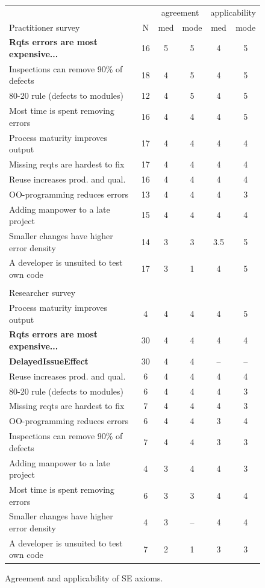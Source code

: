 \documentclass[smallcondensed]{svjour3}
\begin{document}
\begin{figure}[!ht] 
\scriptsize 
 \begin{center}
\begin{tabular}{l|c|c|c|c|c}
 &  & \multicolumn{2}{c|}{agreement} & \multicolumn{2}{c}{applicability} \\
Practitioner survey  & N & med & mode & med & mode \\
\hline 
\textbf{Rqts errors are most expensive...} & 16 & 5 & 5 & 4 & 5 \\ 
Inspections can remove 90\% of defects & 18 & 4 & 5 & 4 & 5 \\
80-20 rule (defects to modules) & 12 & 4 & 5 & 4 & 5 \\
Most time is spent removing errors & 16 & 4 & 4 & 4 & 5 \\ 
Process maturity improves output & 17 & 4 & 4 & 4 & 4 \\ 
Missing reqts are hardest to fix & 17 & 4 & 4 & 4 & 4 \\
Reuse increases prod. and qual. & 16 & 4 & 4 & 4 & 4 \\
OO-programming reduces errors & 13 & 4 & 4 & 4 & 3 \\
Adding manpower to a late project & 15 & 4 & 4 & 4 & 4 \\
Smaller changes have higher error density & 14 & 3 & 3 & 3.5 & 5 \\
A developer is unsuited to test own code & 17 & 3 & 1 & 4 & 5\\
 \multicolumn{6}{l}{}\\
\multicolumn{6}{l}{Researcher survey} \\\hline 
Process maturity improves output & 4 & 4 & 4 & 4 & 5 \\
\textbf{Rqts errors are most expensive...} & 30 & 4 & 4 & 4 & 4   \\ 
\textbf{DelayedIssueEffect} & 30 & 4 & 4 & -- & --  \\
Reuse increases prod. and qual. & 6 & 4 & 4 & 4 & 4 \\
80-20 rule (defects to modules) & 6 & 4 & 4 & 4 & 3 \\
Missing reqts are hardest to fix & 7 & 4 & 4 & 4 & 3 \\
OO-programming reduces errors & 6 & 4 & 4 & 3 & 4 \\
Inspections can remove 90\% of defects & 7 & 4 & 4 & 3 & 3 \\
Adding manpower to a late project & 4 & 3 & 4 & 4 & 3 \\
Most time is spent removing errors & 6 & 3 & 3 & 4 & 4 \\ 
Smaller changes have higher error density & 4 & 3 & -- & 4 & 4 \\
A developer is unsuited to test own code & 7 & 2 & 1 & 3 & 3
\end{tabular} 
 \end{center}
\caption{Agreement and applicability of SE axioms.}
\label{fig:survey_results}
\end{figure}
\end{document}
